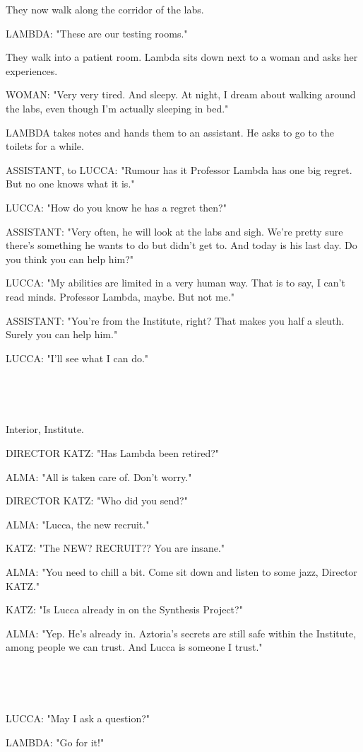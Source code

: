 \documentclass[11pt]{article}
\begin{document}
They now walk along the corridor of the labs.

LAMBDA: "These are our testing rooms."

They walk into a patient room.
Lambda sits down next to a woman and asks her experiences.

WOMAN: "Very very tired. 
And sleepy. 
At night, I dream about walking around the labs, even though I'm actually sleeping in bed."

LAMBDA takes notes and hands them to an assistant.
He asks to go to the toilets for a while.

ASSISTANT, to LUCCA: "Rumour has it Professor Lambda has one big regret.
But no one knows what it is."

LUCCA: "How do you know he has a regret then?"

ASSISTANT: "Very often, he will look at the labs and sigh.
We're pretty sure there's something he wants to do but didn't get to.
And today is his last day.
Do you think you can help him?"

LUCCA: "My abilities are limited in a very human way.
That is to say, I can't read minds.
Professor Lambda, maybe. But not me."

ASSISTANT: "You're from the Institute, right? 
That makes you half a sleuth.
Surely you can help him."

LUCCA: "I'll see what I can do."

\ 

\ 

Interior, Institute.

DIRECTOR KATZ: "Has Lambda been retired?"

ALMA: "All is taken care of. Don't worry."

DIRECTOR KATZ: "Who did you send?"

ALMA: "Lucca, the new recruit."

KATZ: "The NEW? RECRUIT?? You are insane."

ALMA: "You need to chill a bit.
Come sit down and listen to some jazz, Director KATZ."

KATZ: "Is Lucca already in on the Synthesis Project?"

ALMA: "Yep. He's already in. 
Aztoria's secrets are still safe within the Institute, among people we can trust.
And Lucca is someone I trust."

\ 

\ 

LUCCA: "May I ask a question?"

LAMBDA: "Go for it!"
\end{document}
